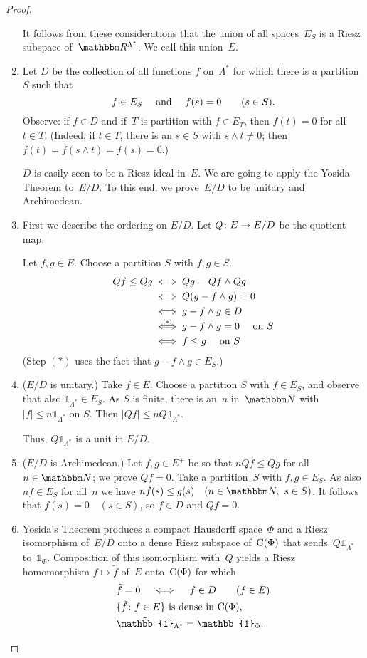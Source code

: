 \documentclass[main.tex]{subfiles}
\begin{document}
\begin{proof}
\begin{enumerate}[label=(\Roman*),leftmargin=*]
It follows from these considerations 
that the union of all spaces~$E_S$
is a Riesz subspace of~$\R^{\Lambda^*}$.
We call this union~$E$.
%
\item \label{3.20-III}
Let $D$ be the collection of all functions $f$ on~$\Lambda^*$
for which there is a partition~$S$ such that
\begin{equation*}
f\in E_S \quad \text{ and } \quad f(s)=0 \qquad (s\in S)\text{.}
\end{equation*}
Observe: if $f\in D$ 
and if~$T$ is  
partition with $f\in E_T$,
then $f(t)=0$ for all $t\in T$.
(Indeed, if $t\in T$,
there is an $s\in S$ with $s\wedge t\neq 0$;
then $f(t)=f(s\wedge t)=f(s)=0$.)

$D$ is easily seen to be a Riesz ideal in~$E$.
We are going to apply the Yosida Theorem to~$E/D$.
To this end, 
we prove~$E/D$
to be unitary and Archimedean.
%
\item \label{3.20-IV}
First we describe the ordering on $E/D$.
Let $Q\colon E\rightarrow E/D$ be the quotient map.

Let $f,g\in E$. 
Choose a partition $S$ with $f,g\in S$.
\begin{align*}
Qf \leq Qg 
& \iff Qg = Qf \wedge Qg \\
& \iff Q(g-f\wedge g)=0 \\
& \iff g-f\wedge g \in D \\
& \mathrel{\smash{ \stackrel{\scriptscriptstyle (*)}{\iff}}} g-f\wedge g =0\quad\text{ on }S \\
& \iff f\leq g\quad\text{ on }S
\end{align*}
(Step $(*)$ uses the fact that $g-f\wedge g\in E_S$.)
%
\item \label{3.20-V}
($E/D$ is unitary.)
Take $f\in E$.
Choose a partition $S$ with $f\in E_S$,
and observe that also
$\mathbb{1}_{\Lambda^*}\in E_S$.
As $S$ is finite, 
there is an~$n$ in~$\N$
with $|f|\leq n \mathbb{1}_{\Lambda^*}$ on $S$.
Then $|Qf|\leq n Q\mathbb{1}_{\Lambda^*}$.

Thus, $Q\mathbb{1}_{\Lambda^*}$ is a unit in $E/D$.
%
\item \label{3.20-VI}
($E/D$ is Archimedean.)
Let $f,g\in E^+$ be so that $nQf\leq Qg$ for all $n\in \N$;
we prove $Qf=0$.
Take a partition~$S$ with $f,g\in E_S$.
As also $nf\in E_S$
for all~$n$
we have $nf(s)\leq g(s)\quad(n\in \N,\ s\in S)$.
It follows that $f(s)=0\quad (s\in S)$,
so $f\in D$ and $Qf=0$.
%
\item \label{3.20-VII}
Yosida's Theorem produces a compact Hausdorff space~$\Phi$
and a Riesz isomorphism of~$E/D$ 
onto a dense Riesz subspace of~$\mathrm{C}(\Phi)$
that sends~$Q\mathbb{1}_{\Lambda^*}$ to~$\mathbb{1}_\Phi$.
Composition of this isomorphism with~$Q$ 
yields a Riesz homomorphism $f\mapsto \tilde{f}$
of~$E$ onto~$\mathrm{C}(\Phi)$ for which
\begin{alignat*}{2}
& \tilde{f} = 0 \quad \iff \quad f\in D\qquad (f\in E) \\
& \{ \tilde{f}\colon f\in E\} \htam{ is dense in } \Cont{\Phi}\htam{, } \\
& \tilde{\mathbb{1}}_{\Lambda^*} = \mathbb{1}_\Phi\htam{.}
\end{alignat*}


\end{enumerate}
\end{proof}
\end{document}
